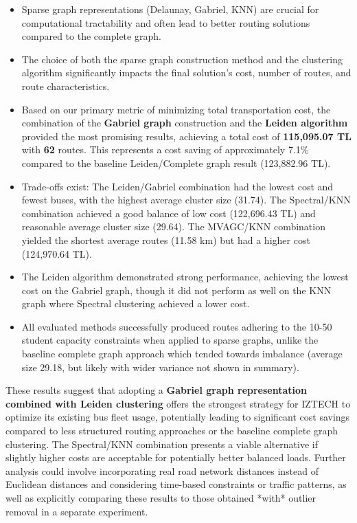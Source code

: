 \begin{itemize}
    \item Sparse graph representations (Delaunay, Gabriel, KNN) are crucial for computational tractability and often lead to better routing solutions compared to the complete graph.
    \item The choice of both the sparse graph construction method and the clustering algorithm significantly impacts the final solution's cost, number of routes, and route characteristics.
    \item Based on our primary metric of minimizing total transportation cost, the combination of the \textbf{Gabriel graph} construction and the \textbf{Leiden algorithm} provided the most promising results, achieving a total cost of \textbf{115,095.07 TL} with \textbf{62} routes. This represents a cost saving of approximately 7.1\% compared to the baseline Leiden/Complete graph result (123,882.96 TL).
    \item Trade-offs exist: The Leiden/Gabriel combination had the lowest cost and fewest buses, with the highest average cluster size (31.74). The Spectral/KNN combination achieved a good balance of low cost (122,696.43 TL) and reasonable average cluster size (29.64). The MVAGC/KNN combination yielded the shortest average routes (11.58 km) but had a higher cost (124,970.64 TL).
    \item The Leiden algorithm demonstrated strong performance, achieving the lowest cost on the Gabriel graph, though it did not perform as well on the KNN graph where Spectral clustering achieved a lower cost.
    \item All evaluated methods successfully produced routes adhering to the 10-50 student capacity constraints when applied to sparse graphs, unlike the baseline complete graph approach which tended towards imbalance (average size 29.18, but likely with wider variance not shown in summary).
\end{itemize}

These results suggest that adopting a \textbf{Gabriel graph representation combined with Leiden clustering} offers the strongest strategy for IZTECH to optimize its existing bus fleet usage, potentially leading to significant cost savings compared to less structured routing approaches or the baseline complete graph clustering. The Spectral/KNN combination presents a viable alternative if slightly higher costs are acceptable for potentially better balanced loads. Further analysis could involve incorporating real road network distances instead of Euclidean distances and considering time-based constraints or traffic patterns, as well as explicitly comparing these results to those obtained *with* outlier removal in a separate experiment.


